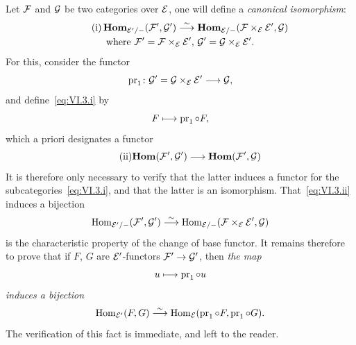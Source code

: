 Let $\cal{F}$ and $\cal{G}$ be two categories over
$\cal{E}$, one will define a \emph{canonical isomorphism}:
\begin{multline*}
\tag{i}
\label{eq:VI.3.i}
\SheafHom_{\cal{E}'/-}(\cal{F}',\cal{G}')\isomto
\SheafHom_{\cal{E}/-}(\cal{F}\times_{\cal{E}}\cal{E}',\cal{G})\\
\text{where }\cal{F}'=\cal{F}\times_{\cal{E}}\cal{E}'\text{, }
\cal{G}'=\cal{G}\times_{\cal{E}}\cal{E}'.
\end{multline*}
For this, consider the functor
$$
\pr_1\colon\cal{G}'=\cal{G}\times_{\cal{E}}\cal{E}'\to \cal{G}\quoi,
$$
and define~\eqref{eq:VI.3.i} by
$$
F\mto \pr_1\circ F\quoi,
$$
which a priori designates a functor
\begin{equation*}
\tag{ii}
\label{eq:VI.3.ii} {\SheafHom(\cal{F}',\cal{G}')\to\SheafHom(\cal{F}',\cal{G})}
\end{equation*}
It is therefore only necessary to verify that the latter induces a functor
for the subcategories~\eqref{eq:VI.3.i}, and that the latter is
an isomorphism. That~\eqref{eq:VI.3.ii} induces a bijection
$$
\Hom_{\cal{E}'/-}(\cal{F}',\cal{G}')\isomto
\Hom_{\cal{E}/-}(\cal{F}\times_{\cal{E}}\cal{E}',\cal{G})
$$
is the characteristic property of the change of
base functor. It remains therefore to
prove that if $F$, $G$ are $\cal{E}'$-functors
$\cal{F}'\to\cal{G}'$, then \emph{the map}
$$
u\mto \pr_1\circ u
$$
\emph{induces a bijection}
$$
\Hom_{\cal{E}'}(F,G)\isomto\Hom_{\cal{E}}(\pr_1\circ F,\pr_1\circ
G)\quoi.
$$
The verification of this fact is immediate, and left to the
reader.

